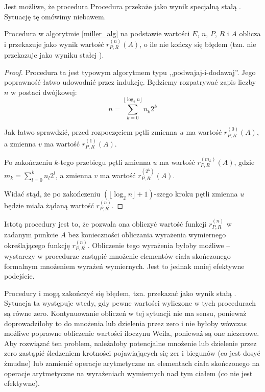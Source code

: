 \begin{remark}
Jest możliwe, że procedura Procedura 
przekaże jako wynik specjalną stałą .
Sytuację tę omówimy niebawem.
\end{remark}

\begin{lemma}\label{compute_value_correct_lemma}
Procedura  w algorytmie \ref{miller_alg}
na podstawie wartości
$E$, $n$, $P$, $R$ i $A$
oblicza i przekazuje jako wynik
wartość $r_{P,R}^{(n)}(A)$,
o ile nie kończy się błędem
(tzn. nie przekazuje jako wyniku stałej ).
\end{lemma}

\begin{proof}
Procedura ta jest typowym algorytmem typu ,,podwajaj-i-dodawaj''.
Jego poprawność łatwo udowodnić przez indukcję.
Będziemy rozpatrywać zapis liczby $n$ w postaci dwójkowej:
\begin{equation*}
n = \sum_{k = 0}^{\lfloor\log_2 n\rfloor} n_k2^k
\end{equation*}

\noindent
Jak łatwo sprawdzić,
przed rozpoczęciem pętli 
zmienna $u$ ma wartość $r_{P,R}^{(0)}(A)$,
a zmienna $v$ ma wartość $r_{P,R}^{(1)}(A)$.

\noindent
Po zakończeniu $k$-tego przebiegu pętli
zmienna $u$ ma wartość $r_{P,R}^{(m_k)}(A)$,
gdzie $m_k = \sum_{l=0}^k n_l2^l$,
a zmienna $v$ ma wartość $r_{P,R}^{(2^k)}(A)$.

\noindent
Widać stąd, że po zakończeniu $(\lfloor\log_2 n\rfloor+1)$-szego kroku pętli
zmienna $u$ będzie miała żądaną wartość $r_{P,R}^{(n)}$.
\end{proof}

\begin{remark}
Istotą procedury  jest to,
że pozwala ona obliczyć wartość funkcji $r_{P,R}^{(n)}$ w zadanym punkcie $A$
bez konieczności obliczania wyrażenia wymiernego
określającego funkcję $r_{P,R}^{(n)}$.
Obliczenie tego wyrażenia byłoby możliwe --
wystarczy w procedurze 
zastąpić mnożenie elementów ciała skończonego
formalnym mnożeniem wyrażeń wymiernych.
Jest to jednak mniej efektywne podejście.
\end{remark}

\begin{remark}\label{return_error_case_remark}
Procedury  i 
mogą zakończyć się błędem, tzn. przekazać jako wynik stałą .
Sytuacja ta występuje wtedy,
gdy pewne wartości wyliczone w tych procedurach są równe zero.
Kontynuowanie obliczeń w tej sytuacji nie ma sensu,
ponieważ doprowadziłoby to do mnożenia lub dzielenia przez zero
i nie byłoby wówczas możliwe poprawne obliczenie wartości iloczynu Weila,
ponieważ są one niezerowe.
Aby rozwiązać ten problem,
należałoby potencjalne mnożenie lub dzielenie przez zero
zastąpić śledzeniem krotności pojawiających się zer i biegunów
(co jest dosyć żmudne)
lub zamienić operacje arytmetyczne na elementach ciała skończonego
na operacje arytmetyczne na wyrażeniach wymiernych nad tym ciałem
(co nie jest efektywne).
\end{remark}

